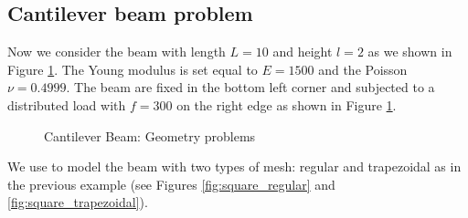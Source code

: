 \documentclass[a4paper,11pt]{article}
\begin{document}
\subsection{Cantilever beam problem}
Now we consider the beam with length $L=10$ and height $l=2$ as we shown in Figure \ref{fig:beam}. The Young modulus is set equal to $E=1500$ and the Poisson $\nu=0.4999$.
The beam are fixed in the bottom left corner and subjected to a distributed load with $f=300$ on the right edge as shown in Figure \ref{fig:beam}.
\begin{figure}[!ht]
\begin{center}

\caption{Cantilever Beam: Geometry problems \label{fig:beam}}
\end{center}
\end{figure}
We use to model the beam with two types of mesh: regular and trapezoidal as in the previous example (see Figures \ref{fig:square_regular} and \ref{fig:square_trapezoidal}).
\end{document}
